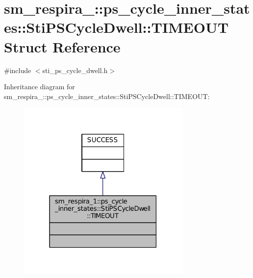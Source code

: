 \hypertarget{structsm__respira__1_1_1ps__cycle__inner__states_1_1StiPSCycleDwell_1_1TIMEOUT}{}\section{sm\+\_\+respira\+\_\+:\+:ps\+\_\+cycle\+\_\+inner\+\_\+states\+:\+:Sti\+P\+S\+Cycle\+Dwell\+:\+:T\+I\+M\+E\+O\+UT Struct Reference}
\label{structsm__respira__1_1_1ps__cycle__inner__states_1_1StiPSCycleDwell_1_1TIMEOUT}


{\ttfamily \#include $<$sti\+\_\+ps\+\_\+cycle\+\_\+dwell.\+h$>$}



Inheritance diagram for sm\+\_\+respira\+\_\+:\+:ps\+\_\+cycle\+\_\+inner\+\_\+states\+:\+:Sti\+P\+S\+Cycle\+Dwell\+:\+:T\+I\+M\+E\+O\+UT\+:
\nopagebreak
\begin{figure}[H]
\begin{center}
\leavevmode
\includegraphics[width=243pt]{structsm__respira__1_1_1ps__cycle__inner__states_1_1StiPSCycleDwell_1_1TIMEOUT__inherit__graph}
\end{center}
\end{figure}


